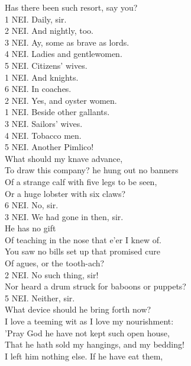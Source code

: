 \documentclass{memoir}
\begin{document}
\begin{drama*}
\scene

\lovewitspeaks  Has there been such resort, say you?\\
1 NEI. Daily, sir.\\
2 NEI. And nightly, too.\\
3 NEI. Ay, some as brave as lords.\\
4 NEI. Ladies and gentlewomen.\\
5 NEI. Citizens' wives.\\
1 NEI. And knights.\\
6 NEI. In coaches.\\
2 NEI. Yes, and oyster women.\\
1 NEI. Beside other gallants.\\
3 NEI. Sailors' wives.\\
4 NEI. Tobacco men.\\
5 NEI. Another Pimlico!\\
\lovewitspeaks {} What should my knave advance,\\
 To draw this company? he hung out no banners\\
 Of a strange calf with five legs to be seen,\\
 Or a huge lobster with six claws?\\
6 NEI. No, sir.\\
3 NEI. We had gone in then, sir.\\
\lovewitspeaks {} He has no gift\\
 Of teaching in the nose that e'er I knew of.\\
 You saw no bills set up that promised cure\\
 Of agues, or the tooth-ach?\\
2 NEI. No such thing, sir!\\
\lovewitspeaks {} Nor heard a drum struck for baboons or puppets?\\
5 NEI. Neither, sir.\\
\lovewitspeaks  What device should he bring forth now?\\
 I love a teeming wit as I love my nourishment:\\
 'Pray God he have not kept such open house,\\
 That he hath sold my hangings, and my bedding!\\
 I left him nothing else. If he have eat them,\\

\end{drama*}
\end{document}
